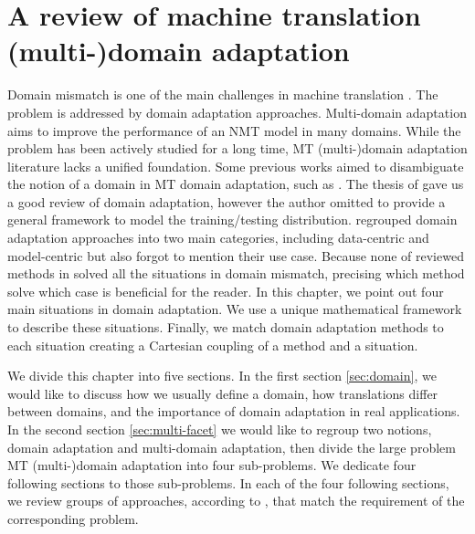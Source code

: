\chapter{A review of machine translation (multi-)domain adaptation} \label{chap:mdmt-review}
Domain mismatch is one of the main challenges in machine translation \citep{koehn17six}. The problem is addressed by domain adaptation approaches. Multi-domain adaptation aims to improve the performance of an NMT model in many domains. While the problem has been actively studied for a long time, MT (multi-)domain adaptation literature lacks a unified foundation. Some previous works aimed to disambiguate the notion of a domain in MT domain adaptation, such as \cite{Wees15Whats,Wees17Whats,Saunders21Domain}. The thesis of \cite{Saunders21Domain} gave us a good review of domain adaptation, however the author omitted to provide a general framework to model the training/testing distribution. \citet{Chu18asurvey} regrouped domain adaptation approaches into two main categories, including data-centric and model-centric but also forgot to mention their use case. Because none of reviewed methods in \citet{Chu18asurvey} solved all the situations in domain mismatch, precising which method solve which case is beneficial for the reader. In this chapter, we point out four main situations in domain adaptation. We use a unique mathematical framework to describe these situations. Finally, we match domain adaptation methods to each situation creating a Cartesian coupling of a method and a situation.

We divide this chapter into five sections. In the first section \ref{sec:domain}, we would like to discuss how we usually define a domain, how translations differ between domains, and the importance of domain adaptation in real applications. In the second section \ref{sec:multi-facet} we would like to regroup two notions, domain adaptation and multi-domain adaptation, then divide the large problem MT (multi-)domain adaptation into four sub-problems. We dedicate four following sections to those sub-problems. In each of the four following sections, we review groups of approaches, according to \citet{Chu18survey}, that match the requirement of the corresponding problem.
